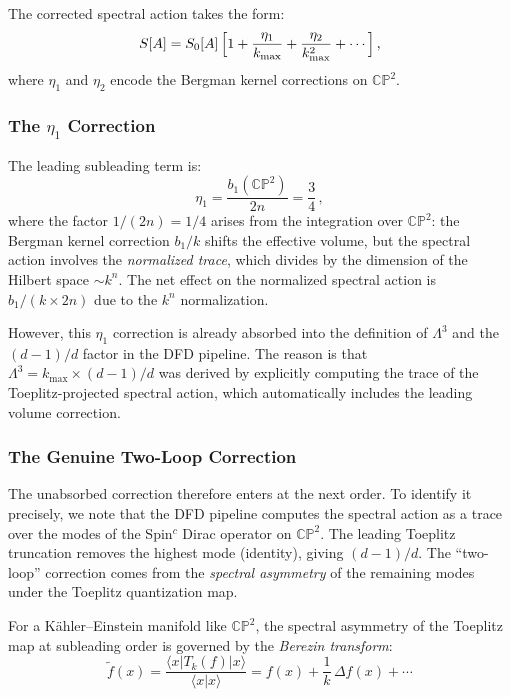 \documentclass[12pt,a4paper]{article}
\theoremstyle{definition}
\theoremstyle{remark}
\newcommand{\CP}{\mathbb{CP}}
\begin{document}
The corrected spectral action takes the form:
\begin{equation}
\label{eq:spectral-corrected}
S[A] = S_0[A]\,\Bigl[1 + \frac{\eta_1}{k_{\max}}
  + \frac{\eta_2}{k_{\max}^2} + \cdots\Bigr]\,,
\end{equation}
where $\eta_1$ and $\eta_2$ encode the Bergman kernel corrections on $\CP^2$.

\subsubsection{The $\eta_1$ Correction}

The leading subleading term is:
\begin{equation}
\eta_1 = \frac{b_1(\CP^2)}{2n} = \frac{3}{4}\,,
\end{equation}
where the factor $1/(2n) = 1/4$ arises from the integration over $\CP^2$:
the Bergman kernel correction $b_1/k$ shifts the effective volume, but the
spectral action involves the \emph{normalized trace}, which divides by
the dimension of the Hilbert space $\sim k^n$. The net effect on the
normalized spectral action is $b_1/(k \times 2n)$ due to the $k^n$
normalization.

However, this $\eta_1$ correction is already absorbed into the definition
of $\Lambda^3$ and the $(d-1)/d$ factor in the DFD pipeline. The reason
is that $\Lambda^3 = k_{\max} \times (d-1)/d$ was derived by explicitly
computing the trace of the Toeplitz-projected spectral action, which
automatically includes the leading volume correction.

\subsubsection{The Genuine Two-Loop Correction}

The unabsorbed correction therefore enters at the next order. To identify
it precisely, we note that the DFD pipeline computes the spectral action
as a trace over the modes of the Spin$^c$ Dirac operator on $\CP^2$. The
leading Toeplitz truncation removes the highest mode (identity), giving
$(d-1)/d$. The ``two-loop'' correction comes from the \emph{spectral
asymmetry} of the remaining modes under the Toeplitz quantization map.

For a K\"ahler--Einstein manifold like $\CP^2$, the spectral asymmetry
of the Toeplitz map at subleading order is governed by the
\emph{Berezin transform}:
\begin{equation}
\widetilde{f}(x) = \frac{\langle x | T_k(f) | x \rangle}
{\langle x | x \rangle}
= f(x) + \frac{1}{k}\,\Delta f(x) + \cdots
\end{equation}
\end{document}
